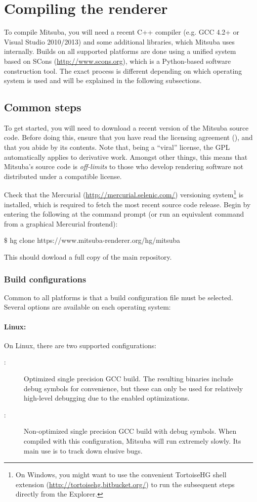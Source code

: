\section{Compiling the renderer}
\label{sec:compiling}
To compile Mitsuba, you will need a recent C++ compiler (e.g. GCC 4.2+ or
Visual Studio 2010/2013) and some additional libraries, which Mitsuba uses internally.
Builds on all supported platforms are done using a unified system
based on SCons (\url{http://www.scons.org}), which is a Python-based
software construction tool. The exact process is different depending on
which operating system is used and will be explained in the following subsections.

\subsection{Common steps}
To get started, you will need to download a recent version of the Mitsuba source code. Before
doing this, ensure that you have read the licensing agreement
(), and that you abide by its contents. Note that, being a ``viral''
license, the GPL automatically applies to derivative work. Amongst other things, this
means that Mitsuba's source code is \emph{off-limits} to those who develop rendering
software not distributed under a compatible license.

Check that the Mercurial (\url{http://mercurial.selenic.com/}) versioning
system\footnote{On Windows, you might want to use the convenient TortoiseHG shell
extension (\url{http://tortoisehg.bitbucket.org/}) to run the subsequent steps directly from the Explorer.}
is installed, which is required to fetch the most recent source code release.
Begin by entering the following at the command prompt (or run an equivalent command from a graphical Mercurial frontend):
\begin{shell}
$\texttt{\$}$ hg clone https://www.mitsuba-renderer.org/hg/mitsuba
\end{shell}
This should dowload a full copy of the main repository.

\subsubsection{Build configurations}
Common to all platforms is that a build configuration file must be selected. Several options are
available on each operating system:
\paragraph{Linux:}
On Linux, there are two supported configurations:
\begin{description}
\item[:] Optimized single precision GCC build. The resulting binaries include debug symbols for convenience, but these can only be used for relatively high-level debugging due to the enabled optimizations.
\item[:] Non-optimized single precision GCC build with debug symbols. When compiled with this configuration, Mitsuba
will run extremely slowly. Its main use is to track down elusive bugs.
\end{description}
